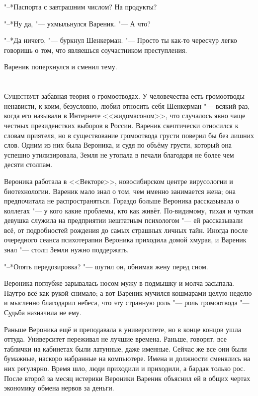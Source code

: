 "--*Паспорта с завтрашним числом?
На продукты?

"--*Ну да, "--- ухмыльнулся Вареник.
"--- А что?

"--*Да ничего, "--- буркнул Шенкерман.
"--- Просто ты как-то чересчур легко говоришь о том, что являешься соучастником преступления.

Вареник поперхнулся и сменил тему.

\chapter{}

\lettrine[lines=4,slope=0pt,nindent=3pt]{С}{уществует} забавная теория о громоотводах.
У человечества есть громоотводы ненависти, к коим, безусловно, любил относить себя Шенкерман "--- всякий раз, когда его называли в Интернете <<жидомасоном>>, что случалось явно чаще честных президенстких выборов в России.
Вареник скептически относился к словам приятеля, но в существование громоотвода грусти поверил бы без лишних слов.
Одним из них была Вероника, и судя по объёму грусти, который она успешно утилизировала, Земля не утопала в печали благодаря не более чем десяти столпам.

Вероника работала в <<Векторе>>, новосибирском центре вирусологии и биотехнологии.
Вареник мало знал о том, чем именно занимается жена;
она предпочитала не распространяться.
Гораздо больше Вероника рассказывала о коллегах "--- у кого какие проблемы, кто как живёт.
По-видимому, тихая и чуткая девушка служила на предприятии нештатным психологом "--- ей рассказывали всё, от подробностей рождения до самых страшных личных тайн.
Иногда после очередного сеанса психотерапии Вероника приходила домой хмурая, и Вареник знал "--- столп Земли нужно поддержать.

"--*Опять передозировка? "--- шутил он, обнимая жену перед сном.

Вероника поглубже зарывалась носом мужу в подмышку и молча засыпала.
Наутро всё как рукой снимало;
а вот Вареник мучился кошмарами целую неделю и мысленно благодарил небеса, что эту странную роль "--- роль громоотвода "--- Судьба назначила не ему.

Раньше Вероника ещё и преподавала в университете, но в конце концов ушла оттуда.
Университет переживал не лучшие времена.
Раньше, говорят, все таблички на кабинетах были латунные, даже именные.
Сейчас же все они были бумажные, наскоро набранные на компьютере.
Имена и должности сменялись на них регулярно.
Время шло, люди приходили и приходили, а бардак только рос.
После второй за месяц истерики Вероники Вареник объяснил ей в общих чертах экономику обмена нервов за деньги.

